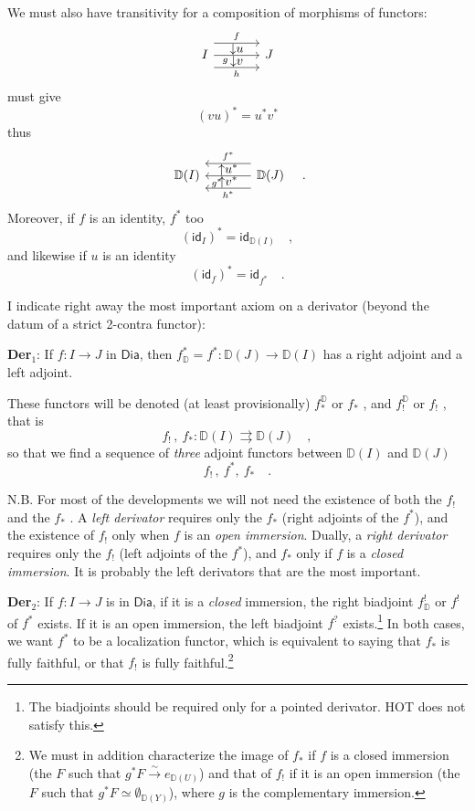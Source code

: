 \documentclass[11pt]{article}
\newcommand{\printedpage}[1]{\marginpar{\footnotesize p.~#1}}
\newcommand{\msp}[1]{\marginpar{\footnotesize [#1]}}
\newcommand{\Dia}{\mathsf{Dia}}
\newcommand{\DD}{\mathbb{D}}
\newcommand{\id}{\mathsf{id}}
\begin{document}
\printedpage{5}

We must also have transitivity for a composition of morphisms of functors:
\[
\begin{tikzcd}[column sep=large]
I \arrow[r, shift left=4, "f"] \arrow[r, "g"' near start] \arrow[r, shift right=4, "h"'] \arrow[r, phantom, shift left=2, "{\downarrow}u"] \arrow[r, phantom, shift right=2, "{\downarrow}v"] & J
\end{tikzcd}
\]
must give
\[ (vu)^* = u^*v^* \]
thus
\[
\begin{tikzcd}[column sep=large]
\DD(I) & \DD(J) \arrow[l, shift right=4, "f^*"'] \arrow[l, "g^*" near end] \arrow[l, shift left=4, "h^*"] \arrow[l, phantom, shift right=2, "{\uparrow}u^*"] \arrow[l, phantom, shift left=2, "{\uparrow}v^*"]
\end{tikzcd}
\quad .
\]
Moreover, if $f$ is an identity, $f^*$ too
\[ (\id_I)^* = \id_{\DD(I)} \quad , \]
and likewise if $u$ is an identity
\[ (\id_f)^* = \id_{f^*} \quad . \]

\msp{page 6}

I indicate right away the most important axiom on a derivator (beyond the datum of a strict 2-contra functor):

\textbf{Der}$_1$: If $f : I \to J$ in $\Dia$, then $f^*_{\DD} = f^* : \DD(J) \to \DD(I)$ has a right adjoint and a left adjoint.

These functors will be denoted (at least provisionally) $f^{\DD}_*$ or $f_*$ , and $f^{\DD}_!$ or $f_!$ , that is
\[ f_! \, , \ f_* : \DD(I) \rightrightarrows \DD(J) \quad , \]
so that we find a sequence of \textit{three} adjoint functors between $\DD(I)$ and $\DD(J)$
\[ f_! \, , \ f^*, \ f_* \quad . \]

N.B. For most of the developments we will not need the existence of both the $f_!$ and the $f_*$ . A \textit{left derivator} requires only the $f_*$ (right adjoints of the $f^*$), and the existence of $f_!$ only when $f$ is an \textit{open immersion}. Dually, a \textit{right derivator} requires only the $f_!$ (left adjoints of the $f^*$), and $f_*$ only if $f$ is a \textit{closed immersion}. It is probably the left derivators that are the most important.

\msp{page 7}

\textbf{Der}$_2$: If $f : I \to J$ is in $\Dia$, if it is a \textit{closed} immersion, the right biadjoint $f^!_{\DD}$ or $f^!$ of $f^*$ exists. If it is an open immersion, the left biadjoint $f^?$ exists.\footnote{The biadjoints should be required only for a pointed derivator. \textsf{HOT} does not satisfy this.} In
\printedpage{6}
both cases, we want $f^*$ to be a localization functor, which is equivalent to saying that $f_*$ is fully faithful, or that $f_!$ is fully faithful.\footnote{We must in addition characterize the image of $f_*$ if $f$ is a closed immersion (the $F$ such that $g^*F \overset{\sim}{\to} e_{\DD(U)}$) and that of $f_!$ if it is an open immersion (the $F$ such that $g^*F \simeq \emptyset_{\DD(Y)}$), where $g$ is the complementary immersion.}
\end{document}
